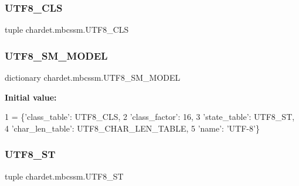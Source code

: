 \subsubsection{\texorpdfstring{U\+T\+F8\+\_\+\+C\+LS}{UTF8\_CLS}}
{\footnotesize\ttfamily tuple chardet.\+mbcssm.\+U\+T\+F8\+\_\+\+C\+LS}

\mbox{\label{namespacechardet_1_1mbcssm_ac4df12909ec4a10d0704929cf2c0b06a}} 
\subsubsection{\texorpdfstring{U\+T\+F8\+\_\+\+S\+M\+\_\+\+M\+O\+D\+EL}{UTF8\_SM\_MODEL}}
{\footnotesize\ttfamily dictionary chardet.\+mbcssm.\+U\+T\+F8\+\_\+\+S\+M\+\_\+\+M\+O\+D\+EL}

{\bfseries Initial value\+:}
\begin{DoxyCode}
1 =  \{\textcolor{stringliteral}{'class\_table'}: UTF8\_CLS,
2                  \textcolor{stringliteral}{'class\_factor'}: 16,
3                  \textcolor{stringliteral}{'state\_table'}: UTF8\_ST,
4                  \textcolor{stringliteral}{'char\_len\_table'}: UTF8\_CHAR\_LEN\_TABLE,
5                  \textcolor{stringliteral}{'name'}: \textcolor{stringliteral}{'UTF-8'}\}
\end{DoxyCode}
\mbox{\label{namespacechardet_1_1mbcssm_a9a3b68e05796cf93a563549e1b1cb93e}} 
\subsubsection{\texorpdfstring{U\+T\+F8\+\_\+\+ST}{UTF8\_ST}}
{\footnotesize\ttfamily tuple chardet.\+mbcssm.\+U\+T\+F8\+\_\+\+ST}

